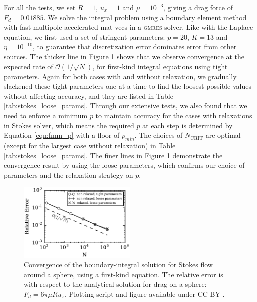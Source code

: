 \documentclass[final,3p,times]{elsarticle}
\renewcommand{\O}[1]{\mathcal{O}(#1)}
\newcommand{\ncrit}{N_{\text{CRIT}}}
\newcommand{\gmres}{\textsc{gmres}\xspace}
\begin{document}
For all the tests, we set $R=1$, $u_x = 1$ and $\mu = 10^{-3}$, giving a drag force of $F_d = 0.01885$. We solve the integral problem using a boundary element method with fast-multipole-accelerated mat-vecs in a \gmres solver.
Like with the Laplace equation, we first used a set of stringent parameters: $p=20$, $K=13$ and $\eta=10^{-10}$, to guarantee that discretization error dominates error from other sources. The thicker line in Figure \ref{fig:stokes_convergence} shows that we observe convergence at the expected rate of $\O{1 / \sqrt{N}}$, for first-kind integral equations using tight parameters. Again for both cases with and without relaxation, we gradually slackened these tight parameters one at a time to find the loosest possible values without affecting accuracy, and they are listed in Table \ref{tab:stokes_loose_params}. Through our extensive tests, we also found that we need to enforce a minimum $p$ to maintain accuracy for the cases with relaxations in Stokes solver, which means the required $p$ at each step is determined by Equation \eqref{eqn:fmm_p} with a floor of $p_{min}$. The choices of $\ncrit$ are optimal (except for the largest case without relaxation) in Table \ref{tab:stokes_loose_params}. The finer lines in Figure \ref{fig:stokes_convergence} demonstrate the convergence result by using the loose parameters, which confirms our choice of parameters and the relaxation strategy on $p$.


\begin{figure}%
\begin{center}
	\includegraphics[natwidth=3in,natheight=2in,width=0.5\textwidth]{StokesConvergence.pdf}
	\caption{Convergence of the boundary-integral solution for Stokes flow around a sphere, using a  first-kind equation. The relative error is with respect to the analytical solution for drag on a sphere: $F_d = 6\pi\mu Ru_x$. Plotting script and figure available under CC-BY \cite{WangLaytonBarba2016-figshare3}.}
	\label{fig:stokes_convergence}
\end{center}
\end{figure}
\end{document}
